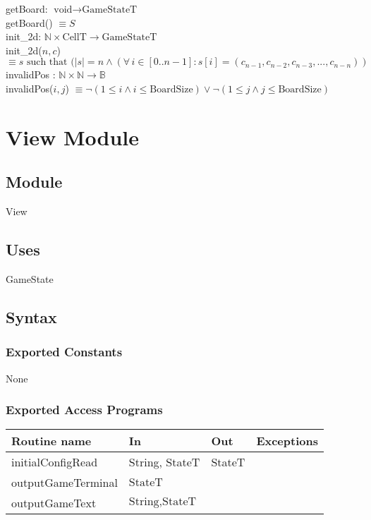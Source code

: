 \documentclass[12pt]{article}
\begin{document}
\noindent getBoard: $\text{void} \rightarrow \mbox{GameStateT}$\\
\noindent getBoard() $\equiv S $\\

\noindent init\_2d: $\mathbb{N} \times \text{CellT} \rightarrow \mbox{GameStateT}$\\
\noindent init\_2d($n, c$) $\equiv s \text{ such that } (|s| = n \land (\forall\, i
\in [0..n-1] : s[i] = (c_{n-1}, c_{n-2}, c_{n-3},...,c_{n-n}))$\\

\noindent  invalidPos : $\mathbb{N} \times \mathbb{N} \rightarrow \mathbb{B}$\\
\noindent invalidPos($i, j$) $\equiv \neg(1 \le i \wedge i \le \mbox{BoardSize}) \vee \neg(1 \le j \wedge j \le \mbox{BoardSize})$\\


\newpage

\section* {View Module}

\subsection* {Module}

View

\subsection* {Uses}

GameState

\subsection* {Syntax}

\subsubsection* {Exported Constants}

None

\subsubsection* {Exported Access Programs}

\begin{tabular}{| l | l | l | l |}
\hline
\textbf{Routine name} & \textbf{In} & \textbf{Out} & \textbf{Exceptions}\\
\hline
initialConfigRead & \mbox{String}, \mbox{StateT} & \mbox{StateT} & ~\\
\hline
outputGameTerminal & $ \mbox{StateT}$ & ~ & ~\\
\hline
outputGameText & $\mbox{String}, \mbox{StateT}$ & ~ & ~\\
\hline
\end{tabular}
\end{document}

